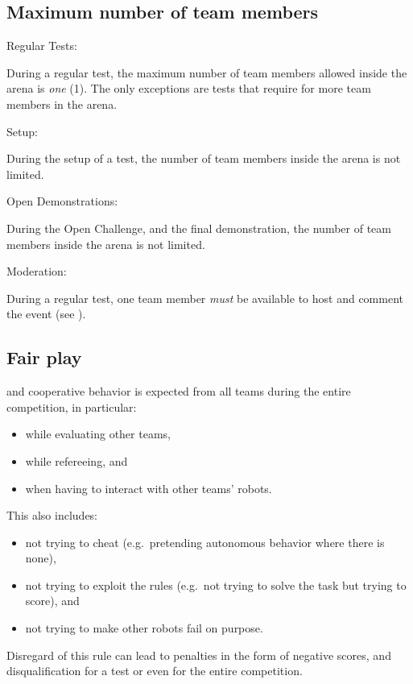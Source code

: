 \subsection{Maximum number of team members}\label{rule:number_of_people}
\begin{enumerate}
  {\bf\item Regular Tests:} During a regular test, the maximum number of team members allowed inside the arena is \emph{one} (1).
    The only exceptions are tests that require for more team members in the arena.
  {\bf\item Setup:} During the setup of a test, 
    the number of team members inside the arena is not limited. 
  {\bf\item Open Demonstrations:} During the Open Challenge, and the final demonstration, 
    the number of team members inside the arena is not limited. 
  {\bf\item Moderation:} During a regular test, one team member \emph{must} be available to host and comment the event (see ).
\end{enumerate}



\subsection{Fair play}\label{rule:fairplay}
 and cooperative behavior is expected from all teams during the entire competition, in particular:
\begin{itemize}
\item while evaluating other teams, 
\item while refereeing, and 
\item when having to interact with other teams' robots.  
\end{itemize}
This also includes:
\begin{itemize}
\item not trying to cheat (e.g.~pretending autonomous behavior where there is none), 
\item not trying to exploit the rules (e.g.~not trying to solve the task but trying to score), and 
\item not trying to make other robots fail on purpose. 
\end{itemize}
Disregard of this rule can lead to penalties in the form of negative scores, and disqualification 
for a test or even for the entire competition. 

